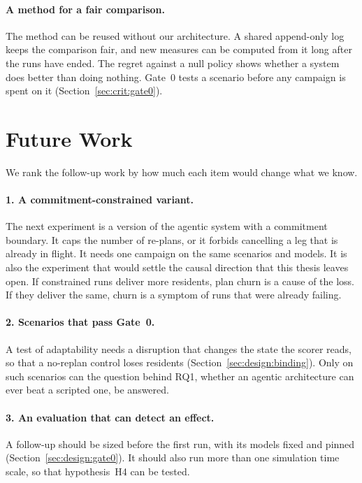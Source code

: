 \paragraph{A method for a fair comparison.} The method can be reused without
our architecture. A shared append-only log keeps the comparison fair, and new
measures can be computed from it long after the runs have ended. The regret
against a null policy shows whether a system does better than doing nothing.
Gate~0 tests a scenario before any campaign is spent on it
(Section~\ref{sec:crit:gate0}).

\section{Future Work}
\label{sec:concl:future}

We rank the follow-up work by how much each item would change what we know.

\paragraph{1. A commitment-constrained variant.} The next experiment is a
version of the agentic system with a commitment boundary. It caps the number
of re-plans, or it forbids cancelling a leg that is already in flight. It
needs one campaign on the same scenarios and models. It is also the experiment that would settle
the causal direction that this thesis leaves open. If constrained runs deliver
more residents, plan churn is a cause of the loss. If they deliver the same,
churn is a symptom of runs that were already failing.

\paragraph{2. Scenarios that pass Gate~0.} A test of adaptability needs a
disruption that changes the state the scorer reads, so that a no-replan
control loses residents (Section~\ref{sec:design:binding}). Only on such
scenarios can the question behind RQ1, whether an agentic architecture can
ever beat a scripted one, be answered.

\paragraph{3. An evaluation that can detect an effect.} A follow-up should be
sized before the first run, with its models fixed and pinned
(Section~\ref{sec:design:gate0}). It should also run more than one simulation
time scale, so that hypothesis~H4 can be tested.


